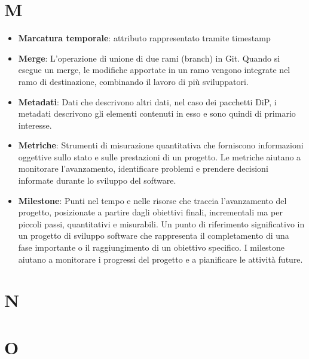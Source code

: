 \documentclass[a4paper,12pt]{article}
\begin{document}
\section{M}
\begin{itemize}
    \item \textbf{Marcatura temporale}: attributo rappresentato tramite timestamp
    \item \textbf{Merge}: L'operazione di unione di due rami (branch) in Git. Quando si esegue un merge, le modifiche apportate in un ramo vengono integrate nel ramo di destinazione, combinando il lavoro di più sviluppatori.
    \item \textbf{Metadati}: Dati che descrivono altri dati, nel caso dei pacchetti DiP, i metadati descrivono gli elementi contenuti in esso e sono quindi di primario interesse.
    \item \textbf{Metriche}: Strumenti di misurazione quantitativa che forniscono informazioni oggettive sullo stato e sulle prestazioni di un progetto. Le metriche aiutano a monitorare l'avanzamento, identificare problemi e prendere decisioni informate durante lo sviluppo del software.
    \item \textbf{Milestone}: Punti nel tempo e nelle risorse che traccia l'avanzamento del progetto, posizionate a partire dagli obiettivi finali, incrementali ma per piccoli passi, quantitativi e misurabili. Un punto di riferimento significativo in un progetto di sviluppo software che rappresenta il completamento di una fase importante o il raggiungimento di un obiettivo specifico. I milestone aiutano a monitorare i progressi del progetto e a pianificare le attività future.
\end{itemize}
\section{N}
\section{O}
\end{document}
